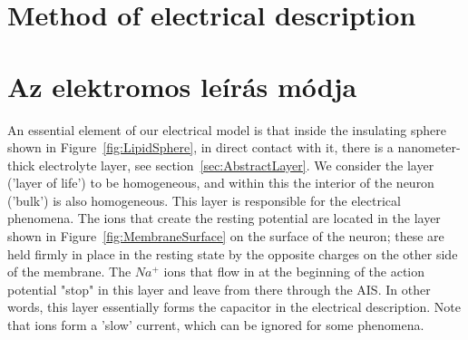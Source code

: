 \fi


\ifx\magyar\undefined
\section[Method of electrical description]{Method of electrical description\label{sec:V2-0_ElectricLanguage}}
\else
\section[Az elektromos leírás módja]{Az elektromos leírás módja\label{sec:V2-0_ElectricLanguage}}
\fi


\ifx\magyar\undefined
An essential element of our electrical model is that inside the insulating sphere shown in Figure~\ref{fig:LipidSphere}, in direct contact with it, there is a nanometer-thick electrolyte layer, see section~\ref{sec:AbstractLayer}. We consider the layer ('layer of life') to be homogeneous, and within this the interior of the neuron ('bulk') is also homogeneous. This layer is responsible for the electrical phenomena. The ions that create the resting potential are located in the layer shown in Figure~\ref{fig:MembraneSurface} on the surface of the neuron; these are held firmly in place in the resting state by the opposite charges on the other side of the membrane. The $Na^+$ ions that flow in at the beginning of the action potential "stop" in this layer and leave from there through the \gls{AIS}. In other words, this layer essentially forms the capacitor in the electrical description. Note that ions form a 'slow' current, which can be ignored for some phenomena.

